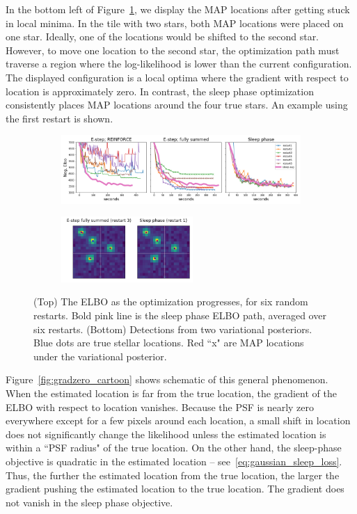 In the bottom left of Figure~\ref{fig:optim_path}, we display the MAP locations after getting stuck in local minima. In the tile with two stars, both MAP locations were placed on one star. Ideally, one of the locations would be shifted to the second star. However, to move one location to the second star, the optimization path must traverse a region where the log-likelihood is lower than the current configuration. The displayed configuration is a local optima where the gradient with respect to location is approximately zero. In contrast, the sleep phase optimization consistently places MAP locations around the four true stars. An example using the first restart is shown. 

\begin{figure}[!htb]
    \centering
    \begin{subfigure}[t]{0.9\textwidth}
    \centering
    \includegraphics[width=\textwidth]{figures/optim_path_compare.png}
    \end{subfigure}
    \begin{subfigure}[t]{\textwidth}
    \centering
    \includegraphics[width=0.55\textwidth]{figures/optim_path_detect_compare.png}
    \end{subfigure}
    \vspace{-3em}
    \caption{(Top) The ELBO as the optimization progresses, for six random restarts. Bold pink line is the sleep phase ELBO path, averaged over six restarts. (Bottom) Detections from two variational posteriors. Blue dots are true stellar locations. Red ``x" are MAP locations under the variational posterior. }
    \label{fig:optim_path}
\end{figure}

Figure~\ref{fig:gradzero_cartoon} shows schematic of this general phenomenon. When the estimated location is far from the true location, the gradient of the ELBO with respect to location vanishes. Because the PSF is nearly zero everywhere except for a few pixels around each location, a small shift in location does not significantly change the likelihood unless the estimated location is within a ``PSF radius" of the true location. On the other hand, the sleep-phase objective is quadratic in the estimated location -- see~\eqref{eq:gaussian_sleep_loss}. Thus, the further the estimated location from the true location, the larger the gradient pushing the estimated location to the true location. The gradient does not vanish in the sleep phase objective. 

